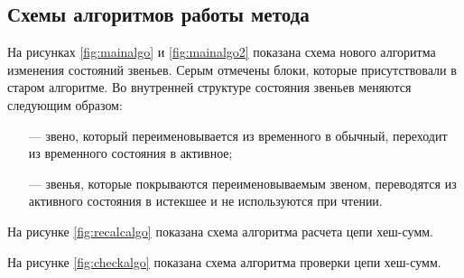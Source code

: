\subsection{Схемы алгоритмов работы метода}

На рисунках \ref{fig:mainalgo} и \ref{fig:mainalgo2} показана схема нового алгоритма изменения состояний звеньев. Серым отмечены блоки, которые присутствовали в старом алгоритме. Во внутренней структуре состояния звеньев меняются следующим образом:
\begin{itemize}
	\item [---] звено, который переименовывается из временного в обычный, переходит из временного состояния в активное;
	\item [---] звенья, которые покрываются переименовываемым звеном, переводятся из активного состояния в истекшее и не используются при чтении.
\end{itemize}

На рисунке \ref{fig:recalcalgo} показана схема алгоритма расчета цепи хеш-сумм.

На рисунке \ref{fig:checkalgo} показана схема алгоритма проверки цепи хеш-сумм.


